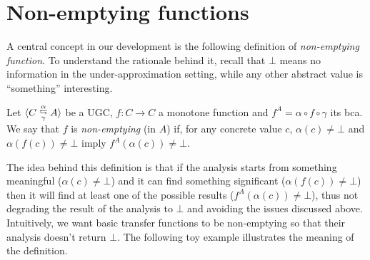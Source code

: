 \section{Non-emptying functions}\label{sec:uai:non-emptying}
A central concept in our development is the following definition of \emph{non-emptying function}. To understand the rationale behind it, recall that $\bot$ means no information in the under-approximation setting, while any other abstract value is ``something'' interesting.
\begin{definition}\label{def:uai:non-emptying}
	Let $\langle C \mathrel{\substack{\alpha \\ \leftrightarrows \\ \gamma}} A\rangle$ be a UGC, $f : C \rightarrow C$ a monotone function and $f^{A} = \alpha \circ f \circ \gamma$ its bca.
	We say that $f$ is \emph{non-emptying} (in $A$) if, for any concrete value $c$, $\alpha(c) \neq \bot$ and $\alpha(f(c)) \neq \bot$ imply $f^{A}(\alpha(c)) \neq \bot$.
\end{definition}
The idea behind this definition is that if the analysis starts from something meaningful ($\alpha(c) \neq \bot$) and it can find something significant ($\alpha(f(c)) \neq \bot$) then it will find at least one of the possible results ($f^{A}(\alpha(c)) \neq \bot$), thus not degrading the result of the analysis to $\bot$ and avoiding the issues discussed above. Intuitively, we want basic transfer functions to be non-emptying so that their analysis doesn't return $\bot$. The following toy example illustrates the meaning of the definition.
